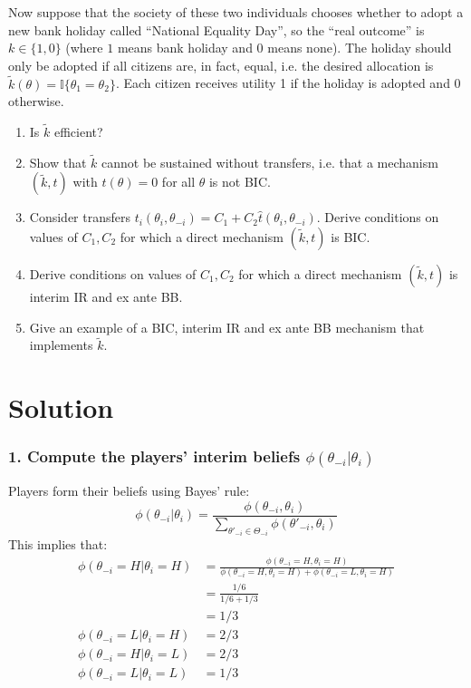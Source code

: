 \documentclass[a4paper]{article}
\newif\ifsolutions
\begin{document}
	Now suppose that the society of these two individuals chooses whether to adopt a new bank holiday called ``National Equality Day'', so the ``real outcome'' is $k \in \{1,0\}$ (where $1$ means bank holiday and $0$ means none). The holiday should only be adopted if all citizens are, in fact, equal, i.e. the desired allocation is $\tilde{k}(\theta) = \mathbb{I} \{\theta_1 = \theta_2\}$. Each citizen receives utility 1 if the holiday is adopted and 0 otherwise.
	\begin{enumerate}[resume]
		\item Is $\tilde{k}$ efficient?
		\item Show that $\tilde{k}$ cannot be sustained without transfers, i.e. that a mechanism $(\tilde{k},t)$ with $t(\theta)=0$ for all $\theta$ is not BIC.
		\item Consider transfers $t_i(\theta_i,\theta_{-i}) = C_1 + C_2 \hat{t} (\theta_i,\theta_{-i})$. Derive conditions on values of $C_1,C_2$ for which a direct mechanism $(\tilde{k},t)$ is BIC.
		\item Derive conditions on values of $C_1,C_2$ for which a direct mechanism $(\tilde{k},t)$ is interim IR and ex ante BB.
		\item Give an example of a BIC, interim IR and ex ante BB mechanism that implements $\tilde{k}$.
	\end{enumerate}

\ifsolutions
\section*{Solution}
	
	\subsubsection*{1. Compute the players' interim beliefs $\phi(\theta_{-i}|\theta_{i})$}
	Players form their beliefs using Bayes' rule:
	\begin{equation}
		\phi(\theta_{-i}|\theta_{i})=\frac{\phi(\theta_{-i},\theta_{i})}{\sum_{\theta'_{-i}\in\Theta_{-i}}\phi(\theta'_{-i},\theta_{i})}
	\end{equation}
	This implies that: 
	\begin{align}
		\phi(\theta_{-i}=H|\theta_{i}=H) &= \frac{\phi(\theta_{-i}=H,\theta_{i}=H)}{\phi(\theta_{-i}=H,\theta_{i}=H)+\phi(\theta_{-i}=L,\theta_{i}=H)} \nonumber \\ 
		&= \frac{1/6}{1/6 + 1/3} \nonumber \\ 
		&= 1/3\\
		\phi(\theta_{-i}=L|\theta_{i}=H)&=2/3\\
		\phi(\theta_{-i}=H|\theta_{i}=L)&=2/3\\
		\phi(\theta_{-i}=L|\theta_{i}=L)&=1/3
	\end{align}
	
\end{document}
